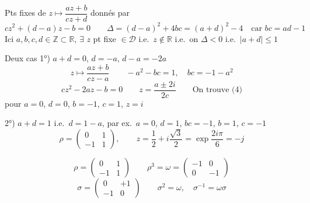 \documentclass[11pt,a4paper]{article}
\begin{document}
Pts fixes de $z \mapsto \dfrac{az + b}{cz + d}$ donnés par
\[
  cz^{2} + (d - a)z - b = 0 \qquad \Delta = (d - a)^{2} + 4bc = (a + d)^{2} - 4 \quad \text{car } bc = ad - 1
\]
Ici $a, b, c, d \in \mathbb{Z} \subset \mathbb{R}$,  \struck{\ill{}}  \ill{} $\exists$ $z$ pt fixe $\in \mathcal{D}$ i.e.\ $z \notin \mathbb{R}$ i.e.\ on \ill{} \ill{} $\Delta < 0$ i.e.\ $|a + d| \leq 1$

Deux cas 
1°) $a + d = 0$, $d = -a$, $d - a = -2a$
\[
  z \mapsto \frac{az + b}{cz - a} \qquad -a^{2} - bc = 1, \quad bc = -1 - a^{2}
\]
\[
  cz^{2} - 2az - b = 0 \qquad z = \frac{a \pm 2i}{2c} \qquad \text{On trouve (4)}
\]
pour $a = 0$, \struck{\ill{}} $d = 0$, $b = -1$, $c = 1$, $z = i$

2°) $a + d = 1$ i.e.\ $d = 1 - a$, par ex.\ $a = 0$, $d = 1$, $bc = -1$, $b = 1$, $c = -1$
\[
  \rho = \begin{pmatrix} 0 & 1 \\ -1 & 1 \end{pmatrix}, \qquad z = \frac{1}{2} + i\frac{\sqrt{3}}{2} = \exp\frac{2i\pi}{6} = -j
\]

\[
  \rho = \begin{pmatrix} 0 & 1 \\ -1 & 1 \end{pmatrix} \qquad \rho^{3} = \omega = \begin{pmatrix} -1 & 0 \\ 0 & -1 \end{pmatrix}
\]
\[
  \sigma = \begin{pmatrix} 0 & +1 \\ -1 & 0 \end{pmatrix} \qquad \sigma^{2} = \omega, \quad \sigma^{-1} = \omega\sigma
\]
\end{document}
